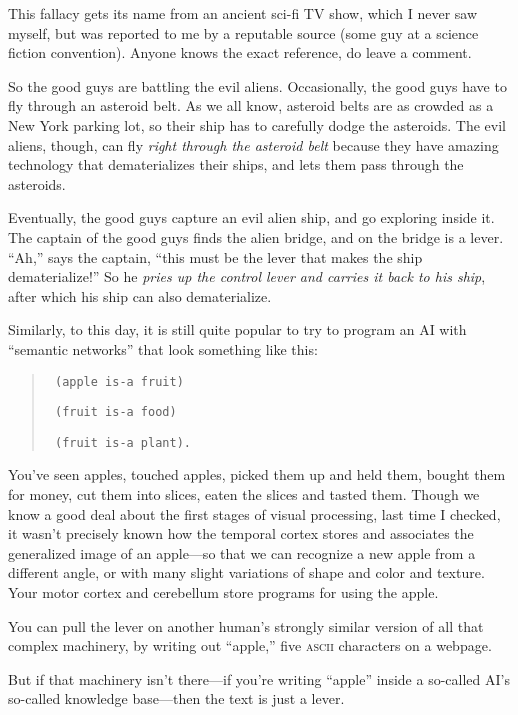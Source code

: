 \myendsectiontext


{
 This fallacy gets its name from an ancient sci-fi TV show, which I
never saw myself, but was reported to me by a reputable source (some
guy at a science fiction convention). Anyone knows the exact reference,
do leave a comment. }

{
 So the good guys are battling the evil aliens. Occasionally, the
good guys have to fly through an asteroid belt. As we all know,
asteroid belts are as crowded as a New York parking lot, so their ship
has to carefully dodge the asteroids. The evil aliens, though, can fly
\textit{right through the asteroid belt} because they have amazing
technology that dematerializes their ships, and lets them pass through
the asteroids.}

{
 Eventually, the good guys capture an evil alien ship, and go
exploring inside it. The captain of the good guys finds the alien
bridge, and on the bridge is a lever.
``Ah,'' says the captain,
``this must be the lever that makes the ship
dematerialize!'' So he \textit{pries up the control
lever and carries it back to his ship}, after which his ship can also
dematerialize.}

{
 Similarly, to this day, it is still quite popular to try to
program an AI with ``semantic
networks'' that look something like this:}

\begin{quote}
\texttt{
 (apple is-a fruit)}

\texttt{
 (fruit is-a food)}

\texttt{
  (fruit is-a plant).}
\end{quote}

{
 You've seen apples, touched apples, picked them up
and held them, bought them for money, cut them into slices, eaten the
slices and tasted them. Though we know a good deal about the first
stages of visual processing, last time I checked, it
wasn't precisely known how the temporal cortex stores
and associates the generalized image of an apple---so that we can
recognize a new apple from a different angle, or with many slight
variations of shape and color and texture. Your motor cortex and
cerebellum store programs for using the apple.}

{
 You can pull the lever on another human's strongly
similar version of all that complex machinery, by writing out
``apple,'' five \textsc{ascii} characters on
a webpage.}

{
 But if that machinery isn't there---if
you're writing
``apple'' inside a so-called
AI's so-called knowledge base---then the text is just a
lever.}

